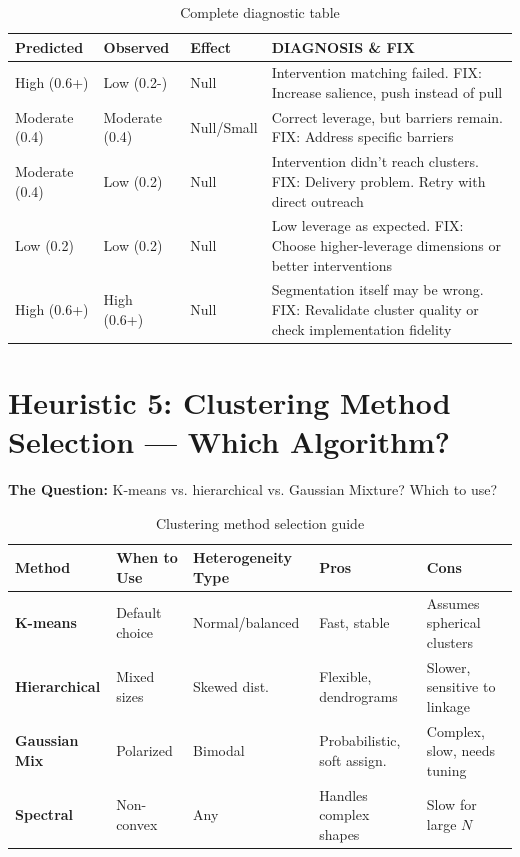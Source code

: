 \begin{table}[h]
\centering
\small
\begin{tabular}{|l|l|l|l|}
\hline
\textbf{Predicted} & \textbf{Observed} & \textbf{Effect} & \textbf{DIAGNOSIS \& FIX} \\
\hline
High (0.6+) & Low (0.2-) & Null & Intervention matching failed. FIX: Increase salience, push instead of pull \\
\hline
Moderate (0.4) & Moderate (0.4) & Null/Small & Correct leverage, but barriers remain. FIX: Address specific barriers \\
\hline
Moderate (0.4) & Low (0.2) & Null & Intervention didn't reach clusters. FIX: Delivery problem. Retry with direct outreach \\
\hline
Low (0.2) & Low (0.2) & Null & Low leverage as expected. FIX: Choose higher-leverage dimensions or better interventions \\
\hline
High (0.6+) & High (0.6+) & Null & Segmentation itself may be wrong. FIX: Revalidate cluster quality or check implementation fidelity \\
\hline
\end{tabular}
\caption{Complete diagnostic table}
\label{tab:h4-complete}
\end{table}


\section{Heuristic 5: Clustering Method Selection --- Which Algorithm?}
\label{sec:h5-clustering-methods}

\textbf{The Question:} K-means vs. hierarchical vs. Gaussian Mixture? Which to use?

\begin{table}[h]
\centering
\small
\begin{tabular}{lllll}
\toprule
\textbf{Method} & \textbf{When to Use} & \textbf{Heterogeneity Type} & \textbf{Pros} & \textbf{Cons} \\
\midrule
\textbf{K-means} & Default choice & Normal/balanced & Fast, stable & Assumes spherical clusters \\
\textbf{Hierarchical} & Mixed sizes & Skewed dist. & Flexible, dendrograms & Slower, sensitive to linkage \\
\textbf{Gaussian Mix} & Polarized & Bimodal & Probabilistic, soft assign. & Complex, slow, needs tuning \\
\textbf{Spectral} & Non-convex & Any & Handles complex shapes & Slow for large $N$ \\
\bottomrule
\end{tabular}
\caption{Clustering method selection guide}
\label{tab:h5-methods}
\end{table}

